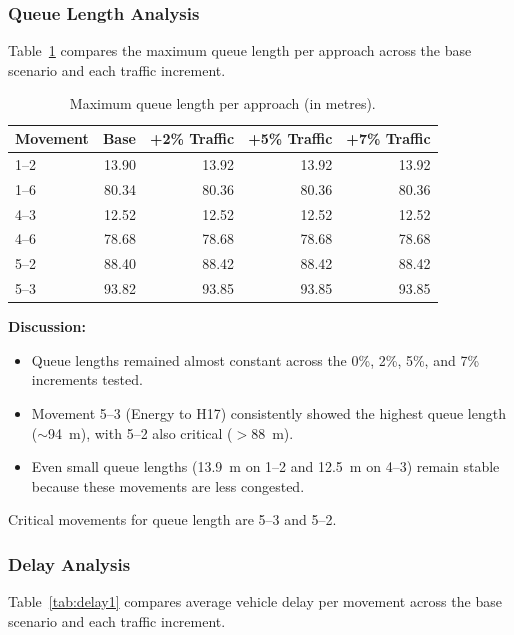 \documentclass[11pt]{article}
\begin{document}
\subsubsection{Queue Length Analysis}
Table~\ref{tab:queuelen1} compares the maximum queue length per approach across the base scenario and
each traffic increment.

\begin{table}[H]
  \centering
  \small
  \caption{Maximum queue length per approach (in metres).}
  \label{tab:queuelen1}
  \begin{tabular}{@{}lrrrr@{}}
    \toprule
    \textbf{Movement} & \textbf{Base} & \textbf{+2\% Traffic} & \textbf{+5\% Traffic} & \textbf{+7\% Traffic} \\
    \midrule
    1--2 & 13.90 & 13.92 & 13.92 & 13.92 \\
    1--6 & 80.34 & 80.36 & 80.36 & 80.36 \\
    4--3 & 12.52 & 12.52 & 12.52 & 12.52 \\
    4--6 & 78.68 & 78.68 & 78.68 & 78.68 \\
    5--2 & 88.40 & 88.42 & 88.42 & 88.42 \\
    5--3 & 93.82 & 93.85 & 93.85 & 93.85 \\
    \bottomrule
  \end{tabular}
\end{table}

\textbf{Discussion:}
\begin{itemize}
  \item Queue lengths remained almost constant across the 0\%, 2\%, 5\%, and 7\% increments tested.
  \item Movement 5--3 (Energy to H17) consistently showed the highest queue length ($\sim$94~m), with
  5--2 also critical ($>$88~m).
  \item Even small queue lengths (13.9~m on 1--2 and 12.5~m on 4--3) remain stable because these
  movements are less congested.
\end{itemize}
Critical movements for queue length are 5--3 and 5--2.

\subsubsection{Delay Analysis}
Table~\ref{tab:delay1} compares average vehicle delay per movement across the base scenario and each
traffic increment.
\end{document}
